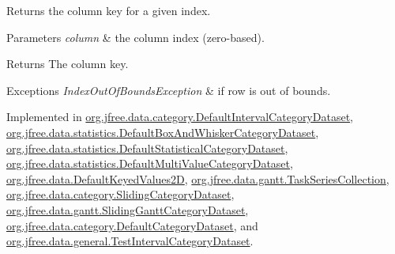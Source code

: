 Returns the column key for a given index.


\begin{DoxyParams}{Parameters}
{\em column} & the column index (zero-\/based).\\
\hline
\end{DoxyParams}
\begin{DoxyReturn}{Returns}
The column key.
\end{DoxyReturn}

\begin{DoxyExceptions}{Exceptions}
{\em Index\+Out\+Of\+Bounds\+Exception} & if {\ttfamily row} is out of bounds. \\
\hline
\end{DoxyExceptions}


Implemented in \mbox{\hyperlink{classorg_1_1jfree_1_1data_1_1category_1_1_default_interval_category_dataset_a522cac1ea57092736c3a2212e97e56b9}{org.\+jfree.\+data.\+category.\+Default\+Interval\+Category\+Dataset}}, \mbox{\hyperlink{classorg_1_1jfree_1_1data_1_1statistics_1_1_default_box_and_whisker_category_dataset_aac3ec96693b12a73f35a21e81a0998b9}{org.\+jfree.\+data.\+statistics.\+Default\+Box\+And\+Whisker\+Category\+Dataset}}, \mbox{\hyperlink{classorg_1_1jfree_1_1data_1_1statistics_1_1_default_statistical_category_dataset_ada7e3476ceb52c6ad531e49297cdfbc9}{org.\+jfree.\+data.\+statistics.\+Default\+Statistical\+Category\+Dataset}}, \mbox{\hyperlink{classorg_1_1jfree_1_1data_1_1statistics_1_1_default_multi_value_category_dataset_a7ee310334e29539ed7ccf42a63323602}{org.\+jfree.\+data.\+statistics.\+Default\+Multi\+Value\+Category\+Dataset}}, \mbox{\hyperlink{classorg_1_1jfree_1_1data_1_1_default_keyed_values2_d_af2df339aaadf2c30c6fb2e331a69c39c}{org.\+jfree.\+data.\+Default\+Keyed\+Values2D}}, \mbox{\hyperlink{classorg_1_1jfree_1_1data_1_1gantt_1_1_task_series_collection_ae2f2a653fe8b60273034e7237b19118f}{org.\+jfree.\+data.\+gantt.\+Task\+Series\+Collection}}, \mbox{\hyperlink{classorg_1_1jfree_1_1data_1_1category_1_1_sliding_category_dataset_aefb8cdefb6baf9ef40d25de9b5c33c63}{org.\+jfree.\+data.\+category.\+Sliding\+Category\+Dataset}}, \mbox{\hyperlink{classorg_1_1jfree_1_1data_1_1gantt_1_1_sliding_gantt_category_dataset_a1030967720c6585c3a46acf80872ce3c}{org.\+jfree.\+data.\+gantt.\+Sliding\+Gantt\+Category\+Dataset}}, \mbox{\hyperlink{classorg_1_1jfree_1_1data_1_1category_1_1_default_category_dataset_a830798ee850da00ea96dcf29f28c70e7}{org.\+jfree.\+data.\+category.\+Default\+Category\+Dataset}}, and \mbox{\hyperlink{classorg_1_1jfree_1_1data_1_1general_1_1_test_interval_category_dataset_a55b29571a2a0e450010e23a8ce7ad872}{org.\+jfree.\+data.\+general.\+Test\+Interval\+Category\+Dataset}}.

